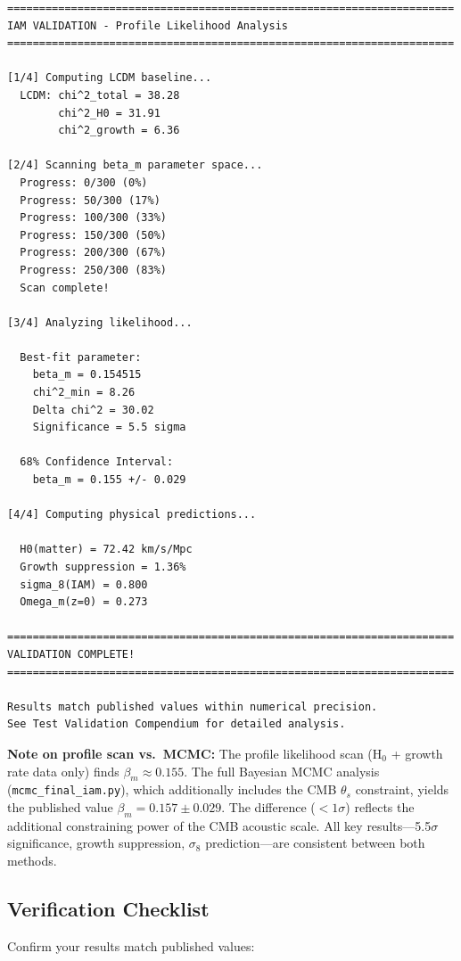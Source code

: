 \documentclass[11pt]{article}
\begin{document}
\begin{lstlisting}
======================================================================
IAM VALIDATION - Profile Likelihood Analysis
======================================================================

[1/4] Computing LCDM baseline...
  LCDM: chi^2_total = 38.28
        chi^2_H0 = 31.91
        chi^2_growth = 6.36

[2/4] Scanning beta_m parameter space...
  Progress: 0/300 (0%)
  Progress: 50/300 (17%)
  Progress: 100/300 (33%)
  Progress: 150/300 (50%)
  Progress: 200/300 (67%)
  Progress: 250/300 (83%)
  Scan complete!

[3/4] Analyzing likelihood...

  Best-fit parameter:
    beta_m = 0.154515
    chi^2_min = 8.26
    Delta chi^2 = 30.02
    Significance = 5.5 sigma

  68% Confidence Interval:
    beta_m = 0.155 +/- 0.029

[4/4] Computing physical predictions...

  H0(matter) = 72.42 km/s/Mpc
  Growth suppression = 1.36%
  sigma_8(IAM) = 0.800
  Omega_m(z=0) = 0.273

======================================================================
VALIDATION COMPLETE!
======================================================================

Results match published values within numerical precision.
See Test Validation Compendium for detailed analysis.
\end{lstlisting}

\noindent\textbf{Note on profile scan vs.\ MCMC:} The profile likelihood scan (H$_0$ + growth rate data only) finds $\beta_m \approx 0.155$. The full Bayesian MCMC analysis (\texttt{mcmc\_final\_iam.py}), which additionally includes the CMB $\theta_s$ constraint, yields the published value $\beta_m = 0.157 \pm 0.029$. The difference ($<1\sigma$) reflects the additional constraining power of the CMB acoustic scale. All key results---5.5$\sigma$ significance, growth suppression, $\sigma_8$ prediction---are consistent between both methods.

\subsection{Verification Checklist}

Confirm your results match published values:
\end{document}
